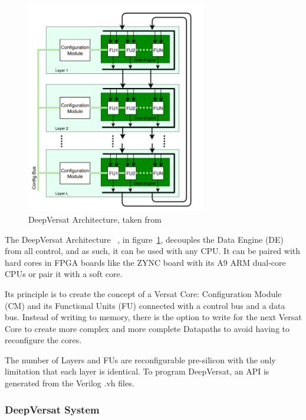 \begin{figure}[!htb]
    \centering
    \includegraphics[width=0.7\textwidth]{Figures/deep-Versat.png}
    \caption{DeepVersat Architecture, taken from~\cite{valter:deepversat}}
    \label{figure:deepversatarch}
\end{figure} 

\quad The DeepVersat Architecture~\cite{valter:deepversat}
, in figure~\ref{figure:deepversatarch}, decouples the Data Engine (DE) from all control, and as such, it can be used with any CPU. 
It can be paired with hard cores in
FPGA boards like the ZYNC board %
with its A9 ARM dual-core CPUs or pair it with a soft core.

Its principle is to create the concept of a Versat Core: Configuration Module (CM) and its Functional Units (FU) connected with a control bus and a data bus.
Instead of writing to memory, there is the option to write for the next
Versat Core to create more complex and more complete Datapaths to avoid
having to reconfigure the cores.

The number of Layers and FUs are reconfigurable pre-silicon with the only limitation
that each layer is identical. To program DeepVersat, an API is generated
from the Verilog .vh files. 




\newpage
\subsubsection{DeepVersat System}

